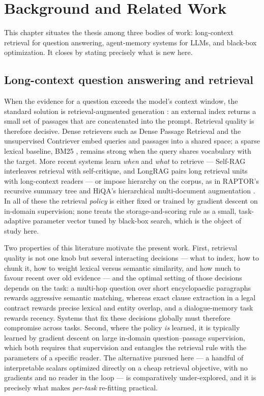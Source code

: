 \chapter{Background and Related Work}
\label{ch:background}

This chapter situates the thesis among three bodies of work: long-context
retrieval for question answering, agent-memory systems for LLMs, and black-box
optimization. It closes by stating precisely what is new here.

\section{Long-context question answering and retrieval}
When the evidence for a question exceeds the model's context window, the standard
solution is retrieval-augmented generation \citep{lewis2020rag}: an external
index returns a small set of passages that are concatenated into the prompt.
Retrieval quality is therefore decisive. Dense retrievers such as Dense Passage
Retrieval \citep{karpukhin2020dpr} and the unsupervised Contriever
\citep{izacard2022contriever} embed queries and passages into a shared space; a
sparse lexical baseline, BM25 \citep{robertson2009bm25}, remains strong when the
query shares vocabulary with the target. More recent systems learn \emph{when}
and \emph{what} to retrieve --- Self-RAG \citep{asai2023selfrag} interleaves
retrieval with self-critique, and LongRAG \citep{jiang2024longrag} pairs long
retrieval units with long-context readers --- or impose hierarchy on the corpus,
as in RAPTOR's recursive summary tree \citep{sarthi2024raptor} and HiQA's
hierarchical multi-document augmentation \citep{tao2024hiqa}. In all of these the
retrieval \emph{policy} is either fixed or trained by gradient descent on
in-domain supervision; none treats the storage-and-scoring rule as a small,
task-adaptive parameter vector tuned by black-box search, which is the object of
study here.

Two properties of this literature motivate the present work. First, retrieval
quality is not one knob but several interacting decisions --- what to index, how
to chunk it, how to weight lexical versus semantic similarity, and how much to
favour recent over old evidence --- and the optimal setting of those decisions
depends on the task: a multi-hop question over short encyclopaedic paragraphs
rewards aggressive semantic matching, whereas exact clause extraction in a legal
contract rewards precise lexical and entity overlap, and a dialogue-memory task
rewards recency. Systems that fix these decisions globally must therefore compromise
across tasks. Second, where the policy \emph{is} learned, it is typically learned
by gradient descent on large in-domain question--passage supervision, which both
requires that supervision and entangles the retrieval rule with the parameters of
a specific reader. The alternative pursued here --- a handful of interpretable
scalars optimized directly on a cheap retrieval objective, with no gradients and
no reader in the loop --- is comparatively under-explored, and it is precisely
what makes \emph{per-task} re-fitting practical.

